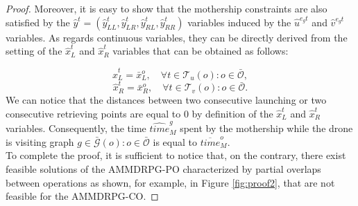 \documentclass[10pt,a4paper]{elsarticle}
\def\AMDCO{{\sf AMMDRPG-CO\xspace}}
\def\AMDPO{{\sf AMMDRPG-PO\xspace}}
\newcommand{\EN}[1]{{\color{black}#1}}
\begin{document}
\begin{proof}
\noindent
Moreover, it is easy to show that the mothership constraints are \EN{also} satisfied by the $\hat y^t=(\hat y_{LL}^t, \hat y_{LR}^t, \hat y_{RL}^t, \hat y_{RR}^t)$ variables induced by the $\hat{u}^{e_gt}$ and $\hat{v}^{e_gt}$ variables. 
\noindent
As regards continuous variables, they can be directly derived from the setting of the $\hat x_L^t$ and $\hat x_R^t$ variables that can be obtained as follows:

$$
\hat x_L^t=\bar x_L^o,\quad \forall t \in \mathcal T_u(o) : o \in \bar{\mathcal O},
$$
$$
\hat x_R^t=\bar x_R^o, \quad \forall t \in \mathcal T_v(o) : o \in \bar{\mathcal O}.
$$
\noindent
We can notice that the distances between two consecutive launching or two consecutive retrieving points are equal to 0 by definition of the $\hat x_L^t$ and $\hat x_R^t$ variables.
Consequently, the time $\widehat{time}_M^g$ spent by the mothership while the drone is visiting graph $g \in \mathcal {\bar{G}}(o): o \in \bar{\mathcal O}$ is equal to $\overline{time}_M^o$.\\
To complete the proof, it is sufficient to notice that, on the contrary, there exist feasible solutions of the \AMDPO\xspace characterized by partial overlaps between operations as shown, for example, in Figure \ref{fig:proof2}, that are not feasible for the \AMDCO.
\end{proof}
\end{document}
